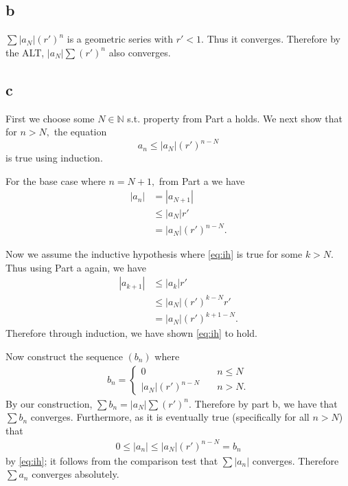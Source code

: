 \documentclass[10pt]{article}
\begin{document}
\subsection*{b}
$\sum |a_N|(r')^n$ is a geometric series with $r' < 1.$ Thus it converges. Therefore by the ALT, $|a_N|\sum (r')^n$ also converges.

\subsection*{c}

First we choose some $N\in\mathbb{N}$ s.t. property from Part a holds. We next show that for $n>N,$ the equation
\begin{equation}\label{eq:ih}
    a_n\le |a_N|(r')^{n-N}
\end{equation}
is true using induction.

For the base case where $n=N+1,$ from Part a we have
\begin{align*}
    |a_n| &= |a_{N+1}|\\
    &\le |a_N|r'\\
    &= |a_N|(r')^{n-N}.
\end{align*}

Now we assume the inductive hypothesis where \eqref{eq:ih} is true for some $k >N.$ Thus using Part a again, we have
\begin{align*}
    |a_{k+1}|&\le |a_k|r'\\
    &\le |a_N|(r')^{k-N}r'\\
    &= |a_N|(r')^{k+1-N}.
\end{align*}
Therefore through induction, we have shown \eqref{eq:ih} to hold.

Now construct the sequence $(b_n)$ where
\begin{align*}
    b_n=\begin{cases}
        0&\quad n\le N\\
        |a_N|(r')^{n-N}&\quad n >N.
    \end{cases}
\end{align*}
By our construction, $\sum b_n = |a_N|\sum(r')^n.$ Therefore by part b, we have that $\sum b_n$ converges. Furthermore, as it is eventually true (specifically for all $n>N$) that
\begin{align*}
    0\le |a_n| \le |a_N|(r')^{n-N}=b_n
\end{align*}
by \eqref{eq:ih}; it follows from the comparison test that $\sum |a_n|$ converges. Therefore $\sum a_n$ converges absolutely.



\end{document}
